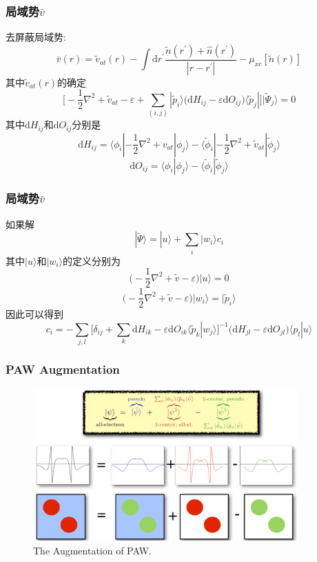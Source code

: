 \documentclass[cjk,slidestop,compress,mathserif,blue]{beamer}
\begin{document}
\frame
{
	\frametitle{\textrm{局域势$\bar v$}}
	去屏蔽局域势:$$\bar v(r)=\tilde v_{at}(r)-\int\mathrm{d}r^{\prime}\dfrac{\tilde n(r^{\prime})+\hat n(r^{\prime})}{|r-r^{\prime}|}-\mu_{xc}[\tilde n(r)]$$
	其中$\tilde v_{at}(r)$的确定
	$$\bigg[-\dfrac12\nabla^2+\tilde v_{at}-\varepsilon+\sum_{(i,j)}|\tilde p_i\rangle\big(\mathrm{d}H_{ij}-\varepsilon\mathrm{d}O_{ij}\big)\langle\tilde p_j|\bigg]|\tilde\Psi_j\rangle=0$$
	其中$\mathrm{d}H_{ij}$和$\mathrm{d}O_{ij}$分别是
	$$\mathrm{d}H_{ij}=\langle\phi_i|-\dfrac12\nabla^2+v_{at}|\phi_j\rangle-\langle\tilde\phi_i|-\dfrac12\nabla^2+\tilde v_{at}|\tilde\phi_j\rangle$$
	$$\mathrm{d}O_{ij}=\langle\phi_i|\phi_j\rangle-\langle\tilde\phi_i|\tilde\phi_j\rangle$$
}

\frame
{
	\frametitle{\textrm{局域势$\bar v$}}
	如果解$$|\tilde\Psi\rangle=|u\rangle+\sum_i|w_i\rangle c_i$$
	其中$|u\rangle$和$|w_i\rangle$的定义分别为
	$$\big(-\frac12\nabla^2+\tilde v-\varepsilon\big)|u\rangle=0$$
	$$\big(-\frac12\nabla^2+\tilde v-\varepsilon\big)|w_i\rangle=|\tilde p_i\rangle$$
	因此可以得到
	$$c_i=-\sum_{j,l}\bigg[\delta_{ij}+\sum_k\mathrm{d}H_{ik}-\varepsilon\mathrm{d}O_{ik}\langle\tilde p_k|w_j\rangle\bigg]^{-1}\big(\mathrm{d}H_{jl}-\varepsilon\mathrm{d}O_{jl}\big)\langle p_l|u\rangle$$
}

\frame
{
	\frametitle{\textrm{PAW Augmentation}}
\begin{figure}[h!]
\centering
\includegraphics[height=2.3in,width=4.0in,viewport=0 0 1280 745,clip]{Figures/PAW-baseset.png}
\caption{\small \textrm{The Augmentation of PAW.}}%
\label{PAW_baiseset}
\end{figure}
}

\end{document}
